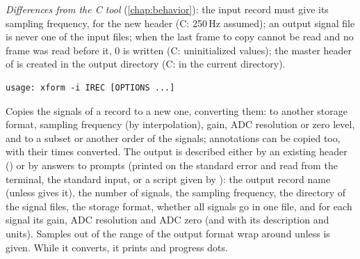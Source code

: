 \textit{Differences from the C tool} (\cref{chap:behavior}): the input record must give its
sampling frequency, for the new header (C: 250\,Hz assumed); an output signal file is never
one of the input files; when the last frame to copy cannot be read and no frame was read
before it, 0 is written (C: uninitialized values); the master header of  is created
in the output directory (C: in the current directory).

\begin{lstlisting}[style=signature,language={}]
usage: xform -i IREC [OPTIONS ...]
\end{lstlisting}
Copies the signals of a record to a new one, converting them: to another storage format,
sampling frequency (by interpolation), gain, ADC resolution or zero level, and to a subset
or another order of the signals; annotations can be copied too, with their times converted.
The output is described either by an existing header () or by answers to prompts
(printed on the standard error and read from the terminal, the standard input, or a script
given by ): the output record name (unless  gives it), the number of
signals, the sampling frequency, the directory of the signal files, the storage format,
whether all signals go in one file, and for each signal its gain, ADC resolution and ADC
zero (and with  its description and units). Samples out of the range of the output
format wrap around unless  is given. While it converts, it prints
 and progress dots.
